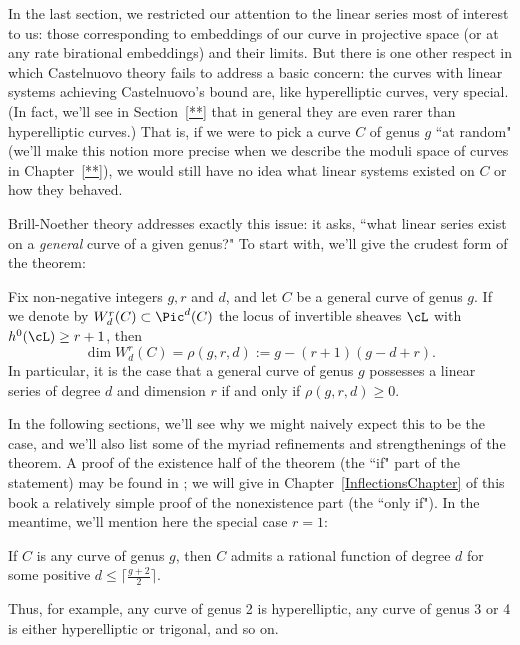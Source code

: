 In the last section, we restricted our attention to the linear series most of interest to us: those corresponding to embeddings of our curve in projective space (or at any rate birational embeddings) and their limits. But there is one other respect in which Castelnuovo theory fails to address a basic concern: the curves with linear systems achieving Castelnuovo's bound are, like hyperelliptic curves, very special. (In fact, we'll see in Section~\ref{**} that in general they are even rarer than hyperelliptic curves.) That is, if we were to pick a curve $C$ of genus $g$ ``at random" (we'll make this notion more precise when we describe the moduli space of curves in Chapter~\ref{**}), we would still have no idea what linear systems existed on $C$ or how they behaved.

Brill-Noether theory addresses exactly this issue: it asks, ``what linear series exist on a \emph{general} curve of a given genus?" To start with, we'll give the crudest form of the theorem:

\begin{theorem}\label{basic BN}
Fix non-negative integers $g, r$ and $d$, and let $C$ be a general curve of genus $g$. If we denote by $W^r_d(C) \subset \Pic^d(C)$ the locus of invertible sheaves $\cL$ with $h^0(\cL) \geq r+1$, then
$$
\dim W^r_d(C) = \rho(g,r,d) := g - (r+1)(g-d+r).
$$
In particular, it is the case that a general curve of genus $g$ possesses a linear series of degree $d$ and dimension $r$ if and only if $\rho(g,r,d) \geq 0$.
\end{theorem}

In the following sections, we'll see why we might naively expect this to be the case, and we'll also list some of the myriad refinements and strengthenings of the theorem.  A proof of the existence half of the theorem (the ``if" part of the statement) may be found in \cite{3264};  we will give in Chapter~\ref{InflectionsChapter} of this book a relatively simple proof of the nonexistence part (the ``only if"). In the meantime, we'll mention here the special case $r=1$:

\begin{corollary}
If $C$ is any curve of genus $g$, then $C$ admits a rational function of degree $d$ for some positive $d \leq \lceil \frac{g+2}{2}\rceil$.
\end{corollary}

Thus, for example, any curve of genus 2 is hyperelliptic, any curve of genus 3 or 4 is either hyperelliptic or trigonal, and so on.

